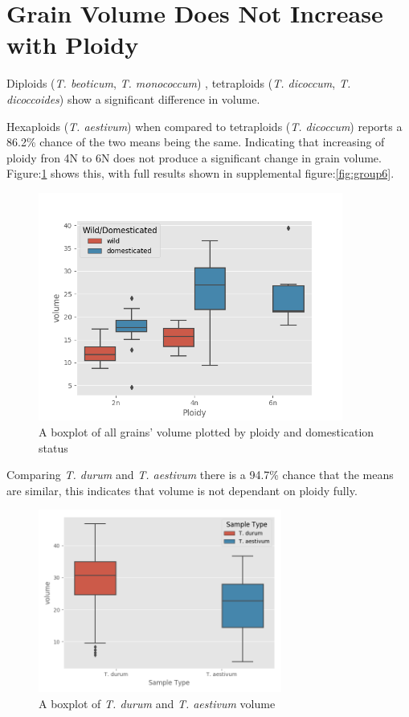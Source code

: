 \documentclass[11pt]{report}
\begin{document}
\clearpage


\section{Grain Volume Does Not Increase with Ploidy}
\label{sec:org0fd0027}

Diploids (\emph{T. beoticum}, \emph{T. monococcum}) , tetraploids (\emph{T. dicoccum}, \emph{T. dicoccoides})  show a significant difference in volume.

Hexaploids (\emph{T. aestivum}) when compared to tetraploids (\emph{T. dicoccum}) reports a 86.2\% chance of the two means being the same. Indicating that increasing of ploidy fron 4N to 6N does not produce a significant change in grain volume. Figure:\ref{fig:orgc3df192} shows this, with full results shown in supplemental figure:\ref{fig:group6}.

\begin{figure}[htbp]
\centering
\includegraphics[width=10cm]{./images/results/ploidyvol.png}
\caption{\label{fig:orgc3df192}
A boxplot of all grains' volume plotted by ploidy and domestication status}
\end{figure}


Comparing \emph{T. durum} and \emph{T. aestivum} there is a 94.7\% chance that the means are similar, this indicates that volume is not dependant on ploidy fully.


\begin{figure}[htbp]
\centering
\includegraphics[width=8cm]{./images/results/group7/volume.png}
\caption{\label{fig:org5f2074c}
A boxplot of \emph{T. durum} and \emph{T. aestivum} volume}
\end{figure}
\end{document}
